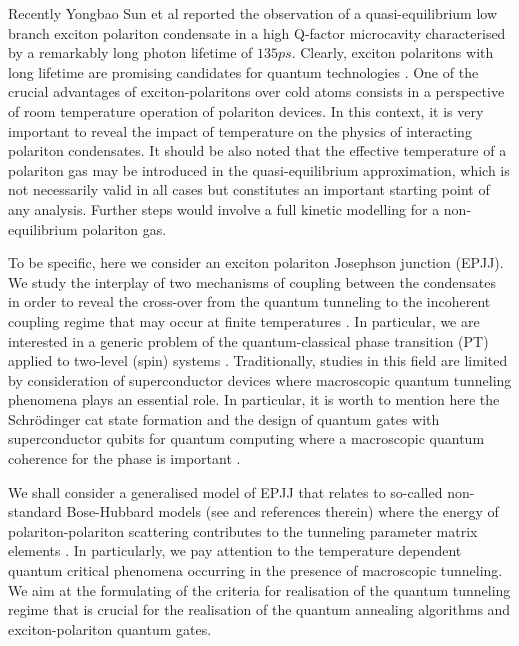 \documentclass[aps, pre, preprint, groupedaddress, superscriptaddress, showkeys, showpacs] {revtex4-1}
\begin{document}
Recently Yongbao Sun et al \cite{Snoke_2017} reported the observation of a quasi-equilibrium low branch exciton polariton condensate in a high Q-factor microcavity characterised by a remarkably long photon lifetime of $135ps$.
Clearly, exciton polaritons with long lifetime are promising candidates for quantum technologies \cite{Demirchyan}.
One of the crucial advantages of exciton-polaritons over cold atoms consists in a perspective of room temperature operation of polariton devices.
In this context, it is very important to reveal the impact of temperature on the physics of interacting polariton condensates.
It should be also noted that the effective temperature of a polariton gas may be introduced in the quasi-equilibrium approximation, which is not necessarily valid in all cases but constitutes an important starting point of any analysis. Further steps would involve a full kinetic modelling for a non-equilibrium polariton gas.  
 
To be specific, here we consider an exciton polariton Josephson junction (EPJJ).
We study the interplay of two mechanisms of coupling between the condensates in order to reveal the cross-over from the quantum tunneling to the incoherent coupling regime that may occur at finite temperatures \cite{Aleiner, Shelykh_2008, Borgh_2010}. 
In particular, we are interested in a generic problem of the quantum-classical phase transition (PT) applied to two-level (spin) systems \cite{Chudnovsky_1997, Caldeira, Larkin, Riseborough, Zhang, Owerre}.
Traditionally,  studies in this field are limited by consideration of superconductor devices \cite{Ankerhold} where macroscopic quantum tunneling phenomena plays an essential role.
In particular, it is worth to mention here the Schr\"odinger cat state formation \cite{Leggett} and the 	design of quantum gates with superconductor qubits for quantum computing where a macroscopic quantum coherence for the phase is important \cite{Makhlin}.
  
We shall consider a generalised model of EPJJ that relates to so-called non-standard Bose-Hubbard models (see \cite{Dutta} and references therein) where the energy of polariton-polariton scattering contributes to the tunneling parameter matrix elements \cite{Aleiner, Shelykh_2008, Borgh_2010, Solnyshkov_2008, Sarchi}.
In particularly, we pay attention to the temperature dependent quantum critical phenomena occurring in the presence of macroscopic tunneling.
We aim at the formulating of the criteria for realisation of the quantum tunneling regime that is crucial for the realisation of the quantum annealing algorithms and exciton-polariton quantum gates.
\end{document}
